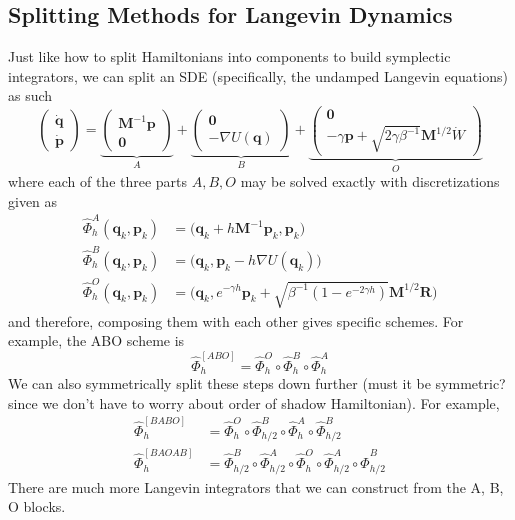 \documentclass{article}
\theoremstyle{remark}
\theoremstyle{definition}
\begin{document}
\subsection{Splitting Methods for Langevin Dynamics}
Just like how to split Hamiltonians into components to build symplectic integrators, we can split an SDE (specifically, the undamped Langevin equations) as such 
\[\begin{pmatrix} \mathbf{\dot{q}} \\ \mathbf{\dot{p}} \end{pmatrix} = \underbrace{\begin{pmatrix} \mathbf{M}^{-1} \mathbf{p} \\ \mathbf{0} \end{pmatrix}}_{A} + \underbrace{\begin{pmatrix} \mathbf{0} \\ -\nabla U(\mathbf{q}) \end{pmatrix}}_{B} + \underbrace{\begin{pmatrix} \mathbf{0} \\ -\gamma \mathbf{p} + \sqrt{2 \gamma \beta^{-1}} \mathbf{M}^{1/2} \dot{W} \end{pmatrix}}_{O} \]
where each of the three parts $A, B, O$ may be solved exactly with discretizations given as 
\begin{align*}
    \hat{\Phi}_h^A (\mathbf{q}_k, \mathbf{p}_k) & = \big(\mathbf{q}_k + h \mathbf{M}^{-1} \mathbf{p}_k, \mathbf{p}_k \big) \\
    \hat{\Phi}_h^B (\mathbf{q}_k, \mathbf{p}_k) & = \big(\mathbf{q}_k, \mathbf{p}_k - h \nabla U(\mathbf{q}_k) \big) \\
    \hat{\Phi}_h^O (\mathbf{q}_k, \mathbf{p}_k) & = \big(\mathbf{q}_k, e^{-\gamma h} \mathbf{p}_k + \sqrt{\beta^{-1} (1 - e^{-2 \gamma h})} \mathbf{M}^{1/2} \mathbf{R}\big)
\end{align*}
and therefore, composing them with each other gives specific schemes. For example, the ABO scheme is 
\[\hat{\Phi}_h^{[ABO]} = \hat{\Phi}_h^O \circ \hat{\Phi}_h^B \circ \hat{\Phi}_h^A\]
We can also symmetrically split these steps down further (must it be symmetric? since we don't have to worry about order of shadow Hamiltonian). For example, 
\begin{align*}
    \hat{\Phi}_h^{[BABO]} & = \hat{\Phi}_h^O \circ \hat{\Phi}_{h/2}^B \circ \hat{\Phi}_h^A \circ \hat{\Phi}_{h/2}^B \\
    \hat{\Phi}_h^{[BAOAB]} & = \hat{\Phi}_{h/2}^B \circ \hat{\Phi}_{h/2}^A \circ \hat{\Phi}_h^O \circ \hat{\Phi}_{h/2}^A \circ \hat{\Phi}_{h/2}^B
\end{align*}
There are much more Langevin integrators that we can construct from the A, B, O blocks. 
\end{document}

